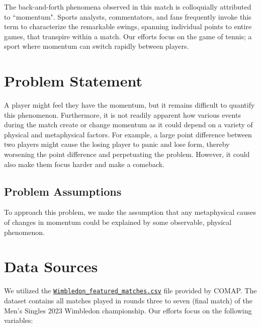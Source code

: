 \documentclass[letterpaper, 12pt]{article}
\begin{document}
        \noindent
        The back-and-forth phenomena observed in this match is colloquially attributed to ``momentum". Sports analysts, commentators, and fans frequently invoke this term to characterize the remarkable swings, spanning individual points to entire games, that transpire within a match. Our efforts focus on the game of tennis; a sport where momentum can switch rapidly between players.
        
    \section{Problem Statement}

        A player might feel they have the momentum, but it remains difficult to quantify this phenomenon. Furthermore, it is not readily apparent how various events during the match create or change momentum as it could depend on a variety of physical and metaphysical factors. For example, a large point difference between two players might cause the losing player to panic and lose form, thereby worsening the point difference and perpetuating the problem. However, it could also make them focus harder and make a comeback.
        
        \subsection{Problem Assumptions}

            To approach this problem, we make the assumption that any metaphysical causes of changes in momentum could be explained by some observable, physical phenomenon.

    \section{Data Sources}

        We utilized the \href{https://www.contest.comap.com/undergraduate/contests/mcm/contests/2024/problems/Wimbledon_featured_matches.csv}{\texttt{Wimbledon\_featured\_matches.csv}} file provided by COMAP. The dataset contains all matches played in rounds three to seven (final match) of the Men's Singles 2023 Wimbledon championship. Our efforts focus on the following variables:
\end{document}

